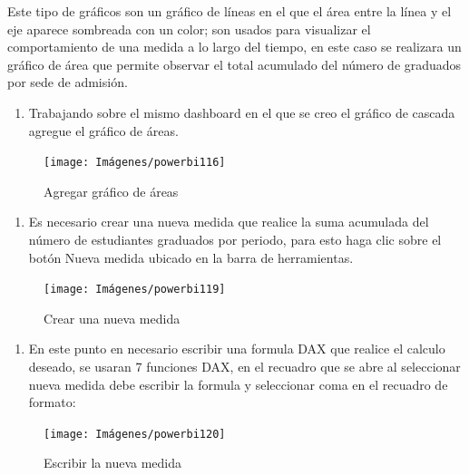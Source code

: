 \documentclass[
]{book}
\providecommand{\tightlist}{%
  \setlength{\itemsep}{0pt}\setlength{\parskip}{0pt}}
\begin{document}
Este tipo de gráficos son un gráfico de líneas en el que el área entre la línea y el eje aparece sombreada con un color; son usados para visualizar el comportamiento de una medida a lo largo del tiempo, en este caso se realizara un gráfico de área que permite observar el total acumulado del número de graduados por sede de admisión.

\begin{enumerate}
\def\labelenumi{\arabic{enumi}.}
\tightlist
\item
  Trabajando sobre el mismo dashboard en el que se creo el gráfico de cascada agregue el gráfico de áreas.
\end{enumerate}

\begin{figure}

{\centering \texttt{[image: Imágenes/powerbi116]} 

}

\caption{Agregar gráfico de áreas}\label{fig:paso1graficoareas-fig}
\end{figure}

\begin{enumerate}
\def\labelenumi{\arabic{enumi}.}
\setcounter{enumi}{1}
\tightlist
\item
  Es necesario crear una nueva medida que realice la suma acumulada del número de estudiantes graduados por periodo, para esto haga clic sobre el botón Nueva medida ubicado en la barra de herramientas.
\end{enumerate}

\begin{figure}

{\centering \texttt{[image: Imágenes/powerbi119]} 

}

\caption{Crear una nueva medida}\label{fig:paso2graficoareas-fig}
\end{figure}

\begin{enumerate}
\def\labelenumi{\arabic{enumi}.}
\setcounter{enumi}{2}
\tightlist
\item
  En este punto en necesario escribir una formula DAX que realice el calculo deseado, se usaran 7 funciones DAX, en el recuadro que se abre al seleccionar nueva medida debe escribir la formula y seleccionar coma en el recuadro de formato:
\end{enumerate}

\begin{figure}

{\centering \texttt{[image: Imágenes/powerbi120]} 

}

\caption{Escribir la nueva medida}\label{fig:paso3graficoareas-fig}
\end{figure}
\end{document}
